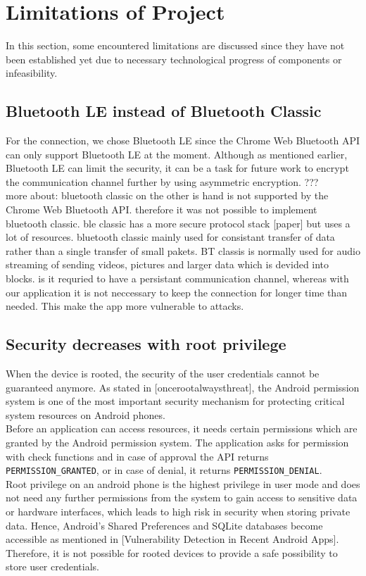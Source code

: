 \section{Limitations of Project}
\label{limitations}


In this section, some encountered limitations are discussed since they have not been established yet due to necessary technological progress of components or infeasibility. \\

\subsection{Bluetooth LE instead of Bluetooth Classic} \label{limitation_ble}
For the connection, we chose Bluetooth LE since the Chrome Web Bluetooth API can only support Bluetooth LE at the moment. Although as mentioned earlier, Bluetooth LE  can limit the security, it can be a task for future work to encrypt the communication channel further by using asymmetric encryption. ??? \\

more about: bluetooth classic on the other is hand is not supported by the Chrome Web Bluetooth API. therefore it was not possible to implement bluetooth classic. ble classic has a more secure protocol stack [paper] but uses a lot of resources. bluetooth classic mainly used for consistant transfer of data rather than a single transfer of small pakets. BT classis is normally used for audio streaming of sending videos, pictures and larger data which is devided into blocks. is it requried to have a persistant communication channel, whereas with our application it is not neccessary to keep the connection for longer time than needed. This make the app more vulnerable to attacks.

\subsection{Security decreases with root privilege} \label{limitations_root}
When the device is rooted, the security of the user credentials cannot be guaranteed anymore. As stated in [oncerootalwaysthreat], the Android permission system is one of the most important security mechanism for protecting critical system resources on Android phones. \\
Before an application can access resources, it needs certain permissions which are granted by the Android permission system. The application asks for permission with check functions and in case of approval the API returns \texttt{PERMISSION\_GRANTED}, or in case of denial, it returns \texttt{PERMISSION\_DENIAL}. \\
Root privilege on an android phone is the highest privilege in user mode and does not need any further permissions from the system to gain access to sensitive data or hardware interfaces, which leads to high risk in security when storing private data. Hence, Android's Shared Preferences and SQLite databases become accessible as mentioned in [Vulnerability Detection in Recent Android Apps]. Therefore, it is not possible for rooted devices to provide a safe possibility to store user credentials. \\
